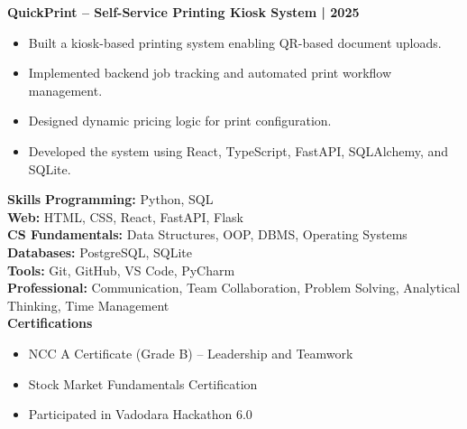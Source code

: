 \documentclass[10pt]{article}
\begin{document}
\textbf{QuickPrint – Self-Service Printing Kiosk System | 2025}
\begin{itemize}
\item Built a kiosk-based printing system enabling QR-based document uploads.
\item Implemented backend job tracking and automated print workflow management.
\item Designed dynamic pricing logic for print configuration.
\item Developed the system using React, TypeScript, FastAPI, SQLAlchemy, and SQLite.
\end{itemize}

\textbf{Skills}
\textbf{Programming:} Python, SQL\\
\textbf{Web:} HTML, CSS, React, FastAPI, Flask\\
\textbf{CS Fundamentals:} Data Structures, OOP, DBMS, Operating Systems\\
\textbf{Databases:} PostgreSQL, SQLite\\
\textbf{Tools:} Git, GitHub, VS Code, PyCharm\\
\textbf{Professional:} Communication, Team Collaboration, Problem Solving, Analytical Thinking, Time Management\\

\textbf{Certifications}
\begin{itemize}
\item NCC A Certificate (Grade B) – Leadership and Teamwork
\item Stock Market Fundamentals Certification
\item Participated in Vadodara Hackathon 6.0
\end{itemize}
\end{document}
